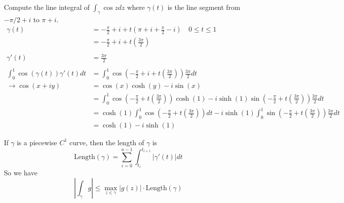 \begin{example}
    Compute the line integral of $\int_{\gamma} \cos z dz$ where $\gamma(t)$ is the line segment from $-\pi/2 + i$ to $\pi + i$.
    \begin{align*}
        \gamma(t)                                  & = -\frac{\pi}{2}  + i + t(\pi + i + \frac{\pi}{2} - i) \quad 0 \leq t \leq 1                                                                         \\
                                                   & = -\frac{\pi}{2} + i + t(\frac{3\pi}{2})                                                                                                             \\\\
        \gamma'(t)                                 & = \frac{3\pi}{2}                                                                                                                                     \\\\
        \int_{0}^{1} \cos(\gamma(t)) \gamma'(t) dt & = \int_{0}^{1} \cos(-\frac{\pi}{2} + i + t(\frac{3\pi}{2})) \frac{3\pi}{2} dt                                                                        \\
        \rightarrow \cos(x + iy)                   & = \cos(x)\cosh(y) - i\sin(x)                                                                                                                         \\
                                                   & = \int_{0}^{1} \cos(-\frac{\pi}{2} + t(\frac{3\pi}{2}))\cosh(1) - i\sinh(1)\sin(-\frac{\pi}{2} + t(\frac{3\pi}{2})) \frac{3\pi}{2} dt                \\
                                                   & = \cosh(1)\int_{0}^{1} \cos(-\frac{\pi}{2} + t(\frac{3\pi}{2}))dt - i\sinh(1)\int_{0}^{1} \sin(-\frac{\pi}{2} + t(\frac{3\pi}{2})) \frac{3\pi}{2} dt \\
                                                   & = \cosh(1) - i\sinh(1)
    \end{align*}

\end{example}

\begin{theorem}
    If $\gamma$ is a piecewise $C^1$ curve, then the length of $\gamma$ is
    $$\text{Length}(\gamma) = \sum_{i = 0}^{n-1}\int_{t_i}^{t_{i + 1}} |\gamma'(t)| dt$$
    So we have
    $$ |\int_{\gamma}g |\leq \max_{z \in \gamma}|g(z)| \cdot \text{Length}(\gamma) $$
\end{theorem}

